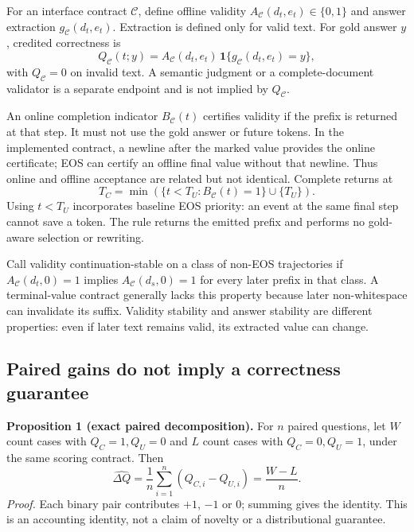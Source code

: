\documentclass[12pt,a4paper]{article}
\begin{document}
For an interface contract $\mathcal C$, define offline validity $A_{\mathcal C}(d_t,e_t)\in\{0,1\}$ and answer extraction $g_{\mathcal C}(d_t,e_t)$. Extraction is defined only for valid text. For gold answer $y$, credited correctness is
\begin{equation}
 Q_{\mathcal C}(t;y)=A_{\mathcal C}(d_t,e_t)\,
 \mathbf 1\{g_{\mathcal C}(d_t,e_t)=y\},
\end{equation}
with $Q_{\mathcal C}=0$ on invalid text. A semantic judgment or a complete-document validator is a separate endpoint and is not implied by $Q_{\mathcal C}$.

An online completion indicator $B_{\mathcal C}(t)$ certifies validity if the prefix is returned at that step. It must not use the gold answer or future tokens. In the implemented contract, a newline after the marked value provides the online certificate; EOS can certify an offline final value without that newline. Thus online and offline acceptance are related but not identical. Complete returns at
\begin{equation}
 T_C=\min\left(\{t<T_U:B_{\mathcal C}(t)=1\}\cup\{T_U\}\right).
\end{equation}
Using $t<T_U$ incorporates baseline EOS priority: an event at the same final step cannot save a token. The rule returns the emitted prefix and performs no gold-aware selection or rewriting.

Call validity continuation-stable on a class of non-EOS trajectories if $A_{\mathcal C}(d_t,0)=1$ implies $A_{\mathcal C}(d_s,0)=1$ for every later prefix in that class. A terminal-value contract generally lacks this property because later non-whitespace can invalidate its suffix. Validity stability and answer stability are different properties: even if later text remains valid, its extracted value can change.

\subsection{Paired gains do not imply a correctness guarantee}
\textbf{Proposition 1 (exact paired decomposition).} For $n$ paired questions, let $W$ count cases with $Q_C=1,Q_U=0$ and $L$ count cases with $Q_C=0,Q_U=1$, under the same scoring contract. Then
\begin{equation}\label{eq:paired}
 \widehat{\Delta Q}=\frac{1}{n}\sum_{i=1}^{n}(Q_{C,i}-Q_{U,i})=\frac{W-L}{n}.
\end{equation}
\emph{Proof.} Each binary pair contributes $+1$, $-1$ or $0$; summing gives the identity. This is an accounting identity, not a claim of novelty or a distributional guarantee.
\end{document}
